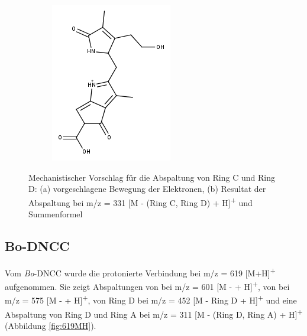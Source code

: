 \begin{figure}[!htbp]
\begin{subfigure}[b]{0.5\textwidth}
    \includegraphics[width=\textwidth]{figures/Kapitel7/Kataboliten/fragmentation_structures/VWA_Katabolit_617-RingD-RingC_331.png}
    \caption{}
    \label{fig:331MH}
  \end{subfigure}
  \caption[Abspaltungsmechanismus von Ring C und Ring D bei \textit{Bo}-DYCC, Quelle: Autor]{Mechanistischer Vorschlag für die Abspaltung von Ring C und Ring D: (a) vorgeschlagene Bewegung der Elektronen, (b) Resultat der Abspaltung bei m/z = 331 [M - (Ring C, Ring D) + H]\textsuperscript{+} und Summenformel }
\end{figure}

\pagebreak
\subsection{Bo-DNCC} \label{sec:ESIMSBoDNCC}

Vom \textit{Bo}-DNCC wurde die protonierte Verbindung bei m/z = 619 [M+H]\textsuperscript{+} aufgenommen. Sie zeigt Abspaltungen von  bei m/z = 601 [M -  + H]\textsuperscript{+}, von  bei m/z = 575 [M -  + H]\textsuperscript{+}, von Ring D bei m/z = 452 [M - Ring D + H]\textsuperscript{+} und eine Abspaltung von Ring D und Ring A bei m/z = 311 [M - (Ring D, Ring A) + H]\textsuperscript{+} (Abbildung \ref{fig:619MH}). 

